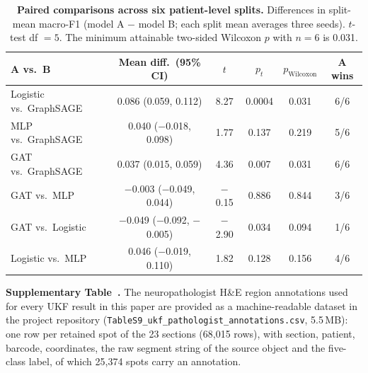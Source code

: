 \documentclass[11pt,letterpaper]{article}
\begin{document}
\begin{table}[H]
\centering
\caption{\textbf{Paired comparisons across six patient-level splits.} Differences in split-mean macro-F1 (model A $-$ model B; each split mean averages three seeds). $t$-test df $= 5$. The minimum attainable two-sided Wilcoxon $p$ with $n = 6$ is 0.031.}
\label{tab:s8}
\small
\begin{tabular}{lccccc}
\toprule
\textbf{A vs.\ B} & \textbf{Mean diff.\ (95\% CI)} & $t$ & $p_t$ & $p_\mathrm{Wilcoxon}$ & \textbf{A wins} \\
\midrule
Logistic vs.\ GraphSAGE & 0.086 (0.059, 0.112)   & 8.27  & 0.0004 & 0.031 & 6/6 \\
MLP vs.\ GraphSAGE      & 0.040 ($-$0.018, 0.098) & 1.77  & 0.137  & 0.219 & 5/6 \\
GAT vs.\ GraphSAGE      & 0.037 (0.015, 0.059)   & 4.36  & 0.007  & 0.031 & 6/6 \\
GAT vs.\ MLP            & $-$0.003 ($-$0.049, 0.044) & $-$0.15 & 0.886 & 0.844 & 3/6 \\
GAT vs.\ Logistic       & $-$0.049 ($-$0.092, $-$0.005) & $-$2.90 & 0.034 & 0.094 & 1/6 \\
Logistic vs.\ MLP       & 0.046 ($-$0.019, 0.110) & 1.82  & 0.128  & 0.156 & 4/6 \\
\bottomrule
\end{tabular}
\end{table}


\vspace{1.5em}
\label{tab:s9}
\begingroup\sloppy
\noindent\textbf{Supplementary Table~\thetable.} The neuropathologist H\&E region annotations used for every UKF result in this paper are provided as a machine-readable dataset in the project repository (\texttt{TableS9\_}\allowbreak\texttt{ukf\_}\allowbreak\texttt{pathologist\_}\allowbreak\texttt{annotations.csv}, 5.5\,MB): one row per retained spot of the 23 sections (68{,}015 rows), with section, patient, barcode, coordinates, the raw segment string of the source object and the five-class label, of which 25{,}374 spots carry an annotation.
\par\endgroup
\end{document}
